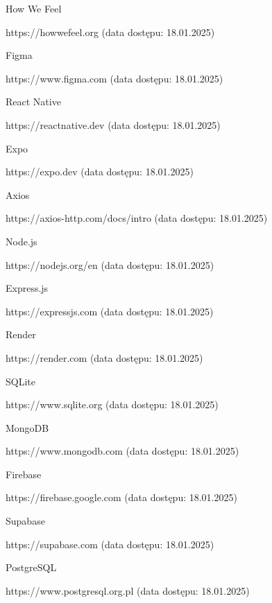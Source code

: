 \documentclass[inz, shortabstract]{iithesis}
\begin{document}
\begin{thebibliography}{1}
 How We Feel

https://howwefeel.org (data dostępu: 18.01.2025)

 Figma

https://www.figma.com (data dostępu: 18.01.2025)

 React Native

https://reactnative.dev (data dostępu: 18.01.2025)

 Expo

https://expo.dev (data dostępu: 18.01.2025)

 Axios

https://axios-http.com/docs/intro (data dostępu: 18.01.2025)

 Node.js

https://nodejs.org/en (data dostępu: 18.01.2025)

 Express.js

https://expressjs.com (data dostępu: 18.01.2025)

 Render 

https://render.com (data dostępu: 18.01.2025)

 SQLite 

https://www.sqlite.org (data dostępu: 18.01.2025)

 MongoDB 

https://www.mongodb.com (data dostępu: 18.01.2025)

 Firebase

https://firebase.google.com (data dostępu: 18.01.2025)

 Supabase

https://supabase.com (data dostępu: 18.01.2025)

 PostgreSQL

https://www.postgresql.org.pl (data dostępu: 18.01.2025)

\end{thebibliography}
\end{document}
